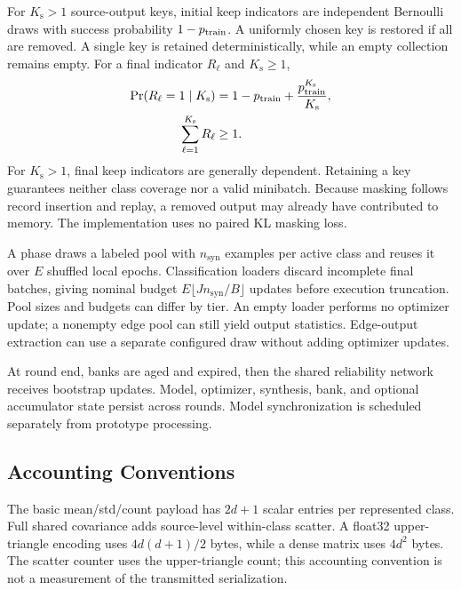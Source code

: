 For $K_{\mathrm s}>1$ source-output keys, initial keep indicators are independent Bernoulli draws with success probability $1-p_{\mathrm{train}}$. A uniformly chosen key is restored if all are removed. A single key is retained deterministically, while an empty collection remains empty. For a final indicator $R_\ell$ and $K_{\mathrm s}\ge1$,
\begin{equation}
\begin{split}
 \Pr(R_\ell=1\mid K_{\mathrm s})
 &=1-p_{\mathrm{train}}
 +\frac{p_{\mathrm{train}}^{K_{\mathrm s}}}{K_{\mathrm s}},\\
 \sum_{\ell=1}^{K_{\mathrm s}}R_\ell&\ge1.
\end{split}
\label{eq:drop_loss}
\end{equation}
For $K_{\mathrm s}>1$, final keep indicators are generally dependent. Retaining a key guarantees neither class coverage nor a valid minibatch. Because masking follows record insertion and replay, a removed output may already have contributed to memory. The implementation uses no paired KL masking loss.

A phase draws a labeled pool with $n_{\mathrm{syn}}$ examples per active class and reuses it over $E$ shuffled local epochs. Classification loaders discard incomplete final batches, giving nominal budget $E\lfloor Jn_{\mathrm{syn}}/B\rfloor$ updates before execution truncation. Pool sizes and budgets can differ by tier. An empty loader performs no optimizer update; a nonempty edge pool can still yield output statistics. Edge-output extraction can use a separate configured draw without adding optimizer updates.

At round end, banks are aged and expired, then the shared reliability network receives bootstrap updates. Model, optimizer, synthesis, bank, and optional accumulator state persist across rounds. Model synchronization is scheduled separately from prototype processing.

\subsection{Accounting Conventions}

The basic mean/std/count payload has $2d+1$ scalar entries per represented class. Full shared covariance adds source-level within-class scatter. A float32 upper-triangle encoding uses $4d(d+1)/2$ bytes, while a dense matrix uses $4d^2$ bytes. The scatter counter uses the upper-triangle count; this accounting convention is not a measurement of the transmitted serialization.

